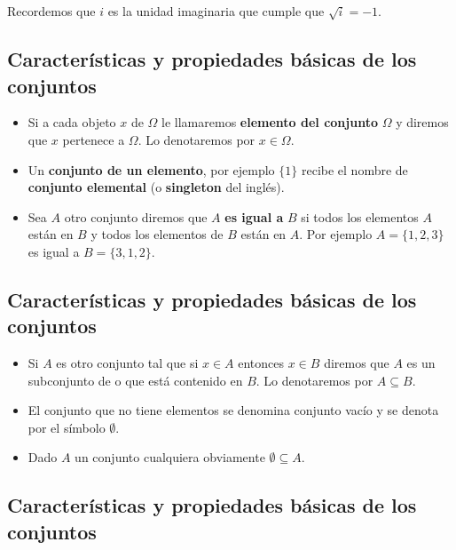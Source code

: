 \documentclass[]{book}
\providecommand{\tightlist}{%
  \setlength{\itemsep}{0pt}\setlength{\parskip}{0pt}}
\begin{document}
Recordemos que \(i\) es la unidad imaginaria que cumple que \(\sqrt{i}=-1\).

\hypertarget{caracteruxedsticas-y-propiedades-buxe1sicas-de-los-conjuntos}{%
\subsection{Características y propiedades básicas de los conjuntos}\label{caracteruxedsticas-y-propiedades-buxe1sicas-de-los-conjuntos}}

\begin{itemize}
\tightlist
\item
  Si a cada objeto \(x\) de \(\Omega\) le llamaremos \textbf{elemento del conjunto} \(\Omega\) y diremos que \(x\) pertenece a \(\Omega\). Lo denotaremos por \(x\in \Omega\).
\item
  Un \textbf{conjunto de un elemento}, por ejemplo \(\{1\}\) recibe el nombre de \textbf{conjunto elemental} (o \textbf{singleton} del inglés).
\item
  Sea \(A\) otro conjunto diremos que \(A\) \textbf{es igual a} \(B\) si todos los elementos \(A\) están en \(B\) y todos los elementos de \(B\) están en \(A\). Por ejemplo \(A=\{1,2,3\}\) es igual a \(B=\{3,1,2\}\).
\end{itemize}

\hypertarget{caracteruxedsticas-y-propiedades-buxe1sicas-de-los-conjuntos-1}{%
\subsection{Características y propiedades básicas de los conjuntos}\label{caracteruxedsticas-y-propiedades-buxe1sicas-de-los-conjuntos-1}}

\begin{itemize}
\tightlist
\item
  Si \(A\) es otro conjunto tal que si \(x\in A\) entonces \(x\in B\) diremos que \(A\) es un subconjunto de o que está contenido en \(B\). Lo denotaremos por \(A\subseteq B.\)
\item
  El conjunto que no tiene elementos se denomina conjunto vacío y se denota por el símbolo \(\emptyset\).
\item
  Dado \(A\) un conjunto cualquiera obviamente \(\emptyset\subseteq A.\)
\end{itemize}

\hypertarget{caracteruxedsticas-y-propiedades-buxe1sicas-de-los-conjuntos-2}{%
\subsection{Características y propiedades básicas de los conjuntos}\label{caracteruxedsticas-y-propiedades-buxe1sicas-de-los-conjuntos-2}}
\end{document}
